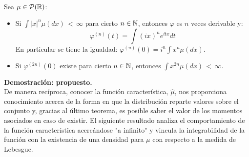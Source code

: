 \begin{teorema} Sea $\mu\in\mathcal{P}(\mathbb R)$:
\begin{itemize}
    \item Si $\int |x|^n \mu(dx)\,<\,\infty$ para cierto $n\in\mathbb N$, entonces $\varphi$ es $n$ veces derivable y:
    \[\varphi^{(n)}(t) =\int (ix)^n e^{itx}dt\]
    En particular se tiene la igualdad: $\varphi^{(n)}(0)=i^n \int x^n \mu(dx)$.
    \item Si $\varphi^{(2n)}(0)$ existe para cierto $n\in\mathbb N$, entonces $\int x^{2n}\mu(dx)\,<\,\infty$.
\end{itemize}
\end{teorema}
\textbf{Demostración: propuesto.}\\ \newline
De manera recíproca, conocer la función característica, $\hat{\mu}$, nos proporciona conocimiento acerca de la forma en que la distribución reparte valores sobre el conjunto y, gracias al último teorema, es posible saber el valor de los momentos asociados en caso de existir. El siguiente resultado analiza el comportamiento de la función característica acercándose "a infinito" y vincula la integrabilidad de la función con la existencia de una densidad para $\mu$ con respecto a la medida de Lebesgue.

